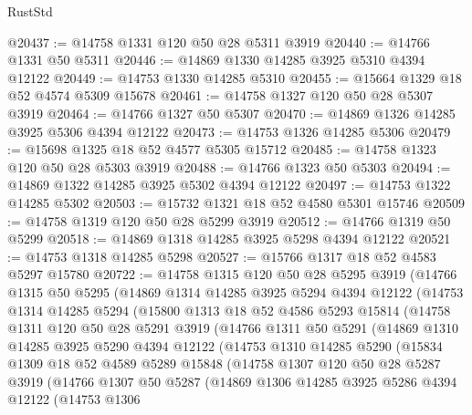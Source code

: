 \begin{lexlean}{RustStd}
\begin{coremodule}
@20437 := @14758 @1331 @120 @50 @28 @5311 @3919
@20440 := @14766 @1331 @50 @5311
@20446 := @14869 @1330 @14285 @3925 @5310 @4394 @12122
@20449 := @14753 @1330 @14285 @5310
@20455 := @15664 @1329 @18 @52 @4574 @5309 @15678
@20461 := @14758 @1327 @120 @50 @28 @5307 @3919
@20464 := @14766 @1327 @50 @5307
@20470 := @14869 @1326 @14285 @3925 @5306 @4394 @12122
@20473 := @14753 @1326 @14285 @5306
@20479 := @15698 @1325 @18 @52 @4577 @5305 @15712
@20485 := @14758 @1323 @120 @50 @28 @5303 @3919
@20488 := @14766 @1323 @50 @5303
@20494 := @14869 @1322 @14285 @3925 @5302 @4394 @12122
@20497 := @14753 @1322 @14285 @5302
@20503 := @15732 @1321 @18 @52 @4580 @5301 @15746
@20509 := @14758 @1319 @120 @50 @28 @5299 @3919
@20512 := @14766 @1319 @50 @5299
@20518 := @14869 @1318 @14285 @3925 @5298 @4394 @12122
@20521 := @14753 @1318 @14285 @5298
@20527 := @15766 @1317 @18 @52 @4583 @5297 @15780
@20722 := @14758
    @1315
    @120
    @50
    @28
    @5295
    @3919
    (@14766
      @1315
      @50
      @5295
      (@14869
        @1314
        @14285
        @3925
        @5294
        @4394
        @12122
        (@14753
          @1314
          @14285
          @5294
          (@15800
            @1313
            @18
            @52
            @4586
            @5293
            @15814
            (@14758
              @1311
              @120
              @50
              @28
              @5291
              @3919
              (@14766
                @1311
                @50
                @5291
                (@14869
                  @1310
                  @14285
                  @3925
                  @5290
                  @4394
                  @12122
                  (@14753
                    @1310
                    @14285
                    @5290
                    (@15834
                      @1309
                      @18
                      @52
                      @4589
                      @5289
                      @15848
                      (@14758
                        @1307
                        @120
                        @50
                        @28
                        @5287
                        @3919
                        (@14766
                          @1307
                          @50
                          @5287
                          (@14869
                            @1306
                            @14285
                            @3925
                            @5286
                            @4394
                            @12122
                            (@14753
                              @1306

\end{coremodule}
\end{lexlean}
